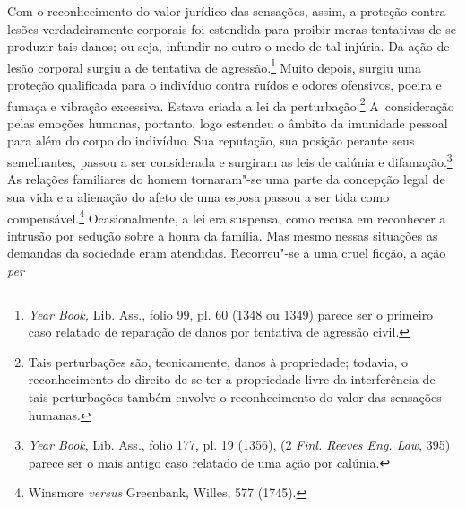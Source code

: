 Com o reconhecimento do valor jurídico das sensações, assim, a proteção
contra lesões verdadeiramente corporais foi estendida para proibir meras
tentativas de se produzir tais danos; ou seja, infundir no outro o medo
de tal injúria. Da ação de lesão corporal surgiu a de tentativa de
agressão.\footnote{\emph{Year Book,} Lib. Ass., folio 99, pl. 60 (1348
  ou 1349) parece ser o primeiro caso relatado de reparação de danos por
  tentativa de agressão civil.} Muito depois, surgiu uma proteção
qualificada para o indivíduo contra ruídos e odores ofensivos, poeira e
fumaça e vibração excessiva. Estava criada a lei da
perturbação.\footnote{Tais perturbações são, tecnicamente, danos à
  propriedade; todavia, o reconhecimento do direito de se ter a
  propriedade livre da interferência de tais perturbações também envolve
  o reconhecimento do valor das sensações humanas.} A~consideração pelas
emoções humanas, portanto, logo estendeu o âmbito da imunidade pessoal
para além do corpo do indivíduo. Sua reputação, sua posição perante seus
semelhantes, passou a ser considerada e surgiram as leis de calúnia e
difamação.\footnote{\emph{Year Book}, Lib. Ass., folio 177, pl. 19
  (1356), (2 \emph{Finl. Reeves Eng. Law}, 395) parece ser o mais antigo
  caso relatado de uma ação por calúnia.} As relações familiares do
homem tornaram"-se uma parte da concepção legal de sua vida e a alienação
do afeto de uma esposa passou a ser tida como compensável.\footnote{Winsmore
  \emph{versus} Greenbank, Willes, 577 (1745).} Ocasionalmente, a lei
era suspensa, como recusa em reconhecer a intrusão por sedução sobre a
honra da família. Mas mesmo nessas situações as demandas da sociedade
eram atendidas. Recorreu"-se a uma cruel ficção, a ação \emph{per}
